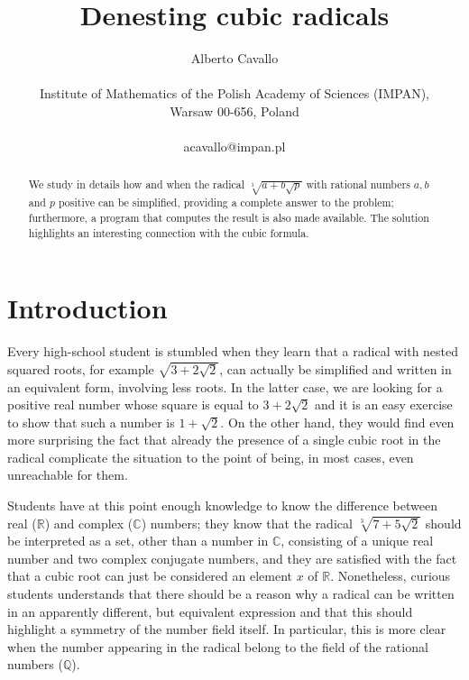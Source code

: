 \documentclass[11pt,a4paper]{article}
\numberwithin{equation}{section}
\newcommand{\R}{\mathbb{R}}
\newcommand{\Q}{\mathbb{Q}}
\newcommand{\C}{\mathbb C}
\theoremstyle{definition}
\begin{document}
\title{Denesting cubic radicals}
\author{Alberto Cavallo \\ \\
 \footnotesize{Institute of Mathematics of the Polish Academy of Sciences (IMPAN),}\\ 
 \footnotesize{Warsaw 00-656, Poland}\\ \\ \small{acavallo@impan.pl}}
\date{}

\maketitle
\begin{abstract}
 We study in details how and when the radical $\sqrt[3]{a+b\sqrt p}$ with rational numbers $a,b$ and $p$ positive can be simplified, providing a complete answer to the problem; furthermore, a program that computes the result is also made available. The solution highlights an interesting connection with the cubic formula. 
\end{abstract}

\section{Introduction}
Every high-school student is stumbled when they learn that a radical with nested squared roots, for example $\sqrt{3+2\sqrt 2}$, can actually be simplified and written in an equivalent form, involving less roots. In the latter case, we are looking for a positive real number whose square is equal to $3+2\sqrt 2$ and it is an easy exercise to show that such a number is $1+\sqrt 2$. 
On the other hand, they would find even more surprising the fact that already the presence of a single cubic root in the radical complicate the situation to the point of being, in most cases, even unreachable for them. 

Students have at this point enough knowledge to know the difference between real ($\R$) and complex ($\C$) numbers; they know that the radical $\sqrt[3]{7+5\sqrt 2}$ should be interpreted as a set, other than a number in $\C$, consisting of a unique real number and two complex conjugate numbers, and they are satisfied with the fact that a cubic root can just be considered an element $x$ of $\R$. 
Nonetheless, curious students understands that there should be a reason why a radical can be written in an apparently different, but equivalent expression and that this should highlight a symmetry of the number field itself. In particular, this is more clear when the number appearing in the radical belong to the field of the rational numbers ($\Q$).
\end{document}
